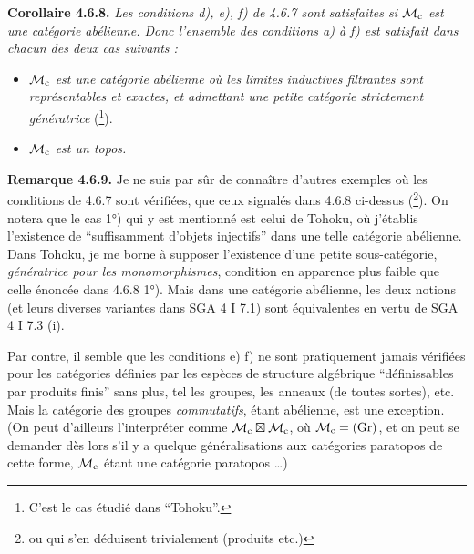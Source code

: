 \textbf{Corollaire 4.6.8.} \textit{Les conditions d), e), f) de 4.6.7 sont satisfaites si $\mathcal{M}_{\mathrm{c}}$ est une catégorie abélienne. Donc l'ensemble des conditions a) à f) est satisfait dans chacun des deux cas suivants :}
\begin{itemize}[leftmargin=4em]
\item[\textit{1)}] \textit{$\mathcal{M}_{\mathrm{c}}$ est une catégorie abélienne où les limites inductives filtrantes sont représentables et exactes, et admettant une petite catégorie strictement génératrice} (\footnote[63]{C'est le cas étudié dans “Tohoku”.}).
\item[\textit{2)}] \textit{$\mathcal{M}_{\mathrm{c}}$ est un topos.}
\end{itemize}
\textbf{Remarque 4.6.9.} Je ne suis par sûr de connaître d'autres exemples où les conditions de 4.6.7 sont vérifiées, que ceux signalés dans 4.6.8 ci-dessus (\footnote[64]{ou qui s'en déduisent trivialement (produits etc.)}). On notera que le cas 1°) qui y est mentionné est celui de Tohoku, où j'établis l'existence de “suffisamment d'objets injectifs” dans une telle catégorie abélienne. Dans Tohoku, je me borne à supposer l'existence d'une petite sous-catégorie, \textit{génératrice pour les monomorphismes}, condition en apparence plus faible que celle énoncée dans 4.6.8 1°). Mais dans une catégorie abélienne, les deux notions (et leurs diverses variantes dans SGA 4 I 7.1) sont équivalentes en vertu de SGA 4 I 7.3 (i). %


Par contre, il semble que les conditions e) f) ne sont pratiquement jamais vérifiées pour les catégories définies par les espèces de structure algébrique “définissables par produits finis” sans plus, tel les groupes, les anneaux (de toutes sortes), etc. Mais la catégorie des groupes \textit{commutatifs}, étant abélienne, est une exception. (On peut d'ailleurs l'interpréter comme $\mathcal{M}_{\mathrm{c}} \boxtimes \mathcal{M}_{\mathrm{c}}$, où $\mathcal{M}_{\mathrm{c}} = (\mathrm{Gr})$, et on peut se demander dès lors s'il y a quelque généralisations aux catégories paratopos de cette forme, $\mathcal{M}_{\mathrm{c}}$ étant une catégorie paratopos \ldots) %


